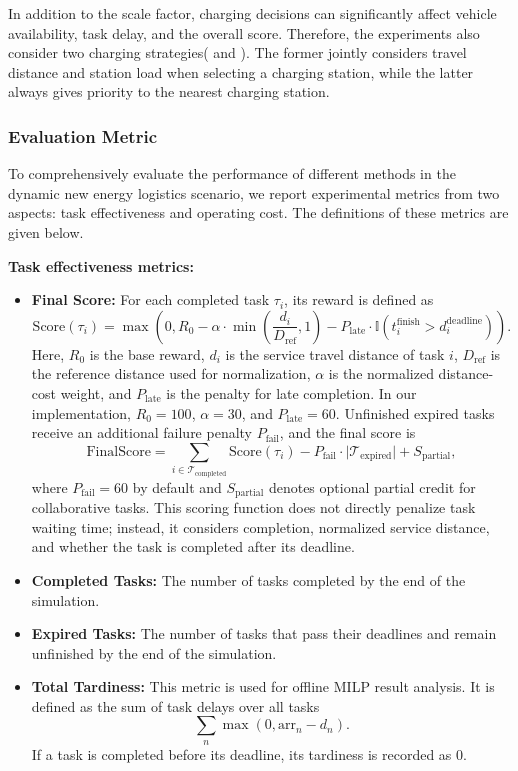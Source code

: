 In addition to the scale factor, charging decisions can significantly affect vehicle availability, task delay, and the overall score. 
Therefore, the experiments also consider two charging strategies( and ). 
The former jointly considers travel distance and station load when selecting a charging station, while the latter always gives priority to the nearest charging station.

\subsubsection{Evaluation Metric}
To comprehensively evaluate the performance of different methods in the dynamic new energy logistics scenario, we report experimental metrics from two aspects: task effectiveness and operating cost. The definitions of these metrics are given below.

\noindent \textbf{Task effectiveness metrics:}
\begin{itemize}
    \item \textbf{Final Score:} For each completed task \(\tau_i\), its reward is defined as
    \[
    \mathrm{Score}(\tau_i)=
    \max\left(
    0,
    R_0
    -\alpha \cdot \min\left(\frac{d_i}{D_{\mathrm{ref}}},1\right)
    -P_{\mathrm{late}}\cdot \mathbb{I}(t_i^{\mathrm{finish}}>d_i^{\mathrm{deadline}})
    \right).
    \]
    Here, \(R_0\) is the base reward, \(d_i\) is the service travel distance of task \(i\), \(D_{\mathrm{ref}}\) is the reference distance used for normalization, \(\alpha\) is the normalized distance-cost weight, and \(P_{\mathrm{late}}\) is the penalty for late completion. In our implementation, \(R_0=100\), \(\alpha=30\), and \(P_{\mathrm{late}}=60\). Unfinished expired tasks receive an additional failure penalty \(P_{\mathrm{fail}}\), and the final score is
    \[
    \mathrm{FinalScore}=
    \sum_{i\in\mathcal{T}_{\mathrm{completed}}}\mathrm{Score}(\tau_i)
    -P_{\mathrm{fail}}\cdot \lvert\mathcal{T}_{\mathrm{expired}}\rvert
    +S_{\mathrm{partial}},
    \]
    where \(P_{\mathrm{fail}}=60\) by default and \(S_{\mathrm{partial}}\) denotes optional partial credit for collaborative tasks. This scoring function does not directly penalize task waiting time; instead, it considers completion, normalized service distance, and whether the task is completed after its deadline.
    
    \item \textbf{Completed Tasks:} The number of tasks completed by the end of the simulation.
    \item \textbf{Expired Tasks:} The number of tasks that pass their deadlines and remain unfinished by the end of the simulation.
    \item \textbf{Total Tardiness:} This metric is used for offline MILP result analysis. It is defined as the sum of task delays over all tasks
    \[
    \sum_n \max(0, \mathrm{arr}_n-d_n).
    \]
    If a task is completed before its deadline, its tardiness is recorded as 0.
\end{itemize}

